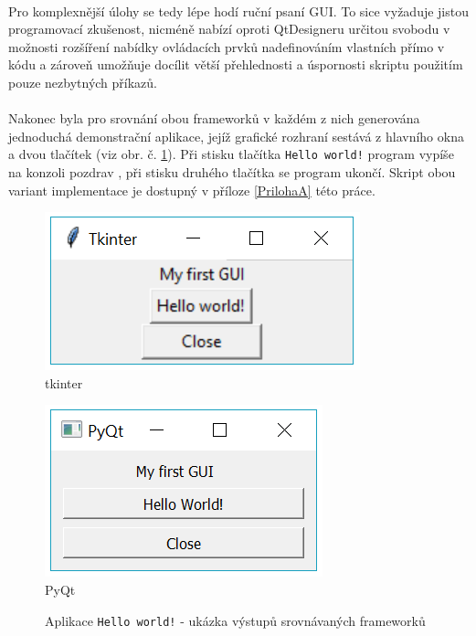 \documentclass[a4paper, 12pt]{article}
\begin{document}
\\
\noindent Pro komplexnější úlohy se tedy lépe hodí ruční psaní GUI. To sice vyžaduje jistou programovací zkušenost, nicméně nabízí oproti QtDesigneru určitou svobodu v možnosti rozšíření nabídky ovládacích prvků nadefinováním vlastních přímo v kódu a zároveň umožňuje docílit větší přehlednosti a úspornosti skriptu použitím pouze nezbytných příkazů.
\\
\\
Nakonec byla pro srovnání obou frameworků v každém z nich generována  jednoduchá demonstrační aplikace, jejíž grafické rozhraní sestává z hlavního okna a dvou tlačítek (viz obr. č. \ref{fig:myfirstgui}). Při stisku tlačítka \texttt{Hello world!} program vypíše na konzoli pozdrav , při stisku druhého tlačítka se program ukončí. Skript obou variant implementace je dostupný v příloze \ref{PrilohaA} této práce.

\begin{figure}[h!]
\centering
\begin{minipage}[b][4cm]{5cm}
  \centering
  \includegraphics[width=\linewidth]{tkinter_myfirstgui.png}\\
  tkinter
  \captionsetup{labelformat=empty}
\end{minipage}\hspace{1.5cm}
\begin{minipage}[b][4cm]{5cm}
  \centering
  \includegraphics[width=\linewidth]{pyqt_myfirstgui.png}\\
  PyQt
  \captionsetup{labelformat=empty}
\end{minipage}
\caption{Aplikace \texttt{Hello world!} - ukázka výstupů srovnávaných frameworků}
\label{fig:myfirstgui}
\end{figure}
\end{document}
